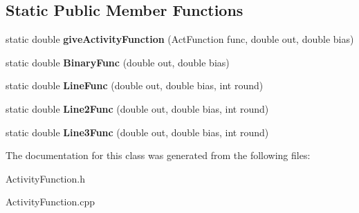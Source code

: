 \subsection*{Static Public Member Functions}
\begin{DoxyCompactItemize}
\item 
\hypertarget{class_activity_function_af2979865b0ed0fdd45f87b794c05bdc7}{}\label{class_activity_function_af2979865b0ed0fdd45f87b794c05bdc7} 
static double {\bfseries give\+Activity\+Function} (Act\+Function func, double out, double bias)
\item 
\hypertarget{class_activity_function_a9750a0424198f685946b3e3b8d3d19b0}{}\label{class_activity_function_a9750a0424198f685946b3e3b8d3d19b0} 
static double {\bfseries Binary\+Func} (double out, double bias)
\item 
\hypertarget{class_activity_function_a3992015d3e75ed3c00590b446271be72}{}\label{class_activity_function_a3992015d3e75ed3c00590b446271be72} 
static double {\bfseries Line\+Func} (double out, double bias, int round)
\item 
\hypertarget{class_activity_function_a13f9b922b9a349b91504fdc5c8606f89}{}\label{class_activity_function_a13f9b922b9a349b91504fdc5c8606f89} 
static double {\bfseries Line2\+Func} (double out, double bias, int round)
\item 
\hypertarget{class_activity_function_a61fdd8afefca23b237685a2f7a303475}{}\label{class_activity_function_a61fdd8afefca23b237685a2f7a303475} 
static double {\bfseries Line3\+Func} (double out, double bias, int round)
\end{DoxyCompactItemize}


The documentation for this class was generated from the following files\+:\begin{DoxyCompactItemize}
\item 
Activity\+Function.\+h\item 
Activity\+Function.\+cpp\end{DoxyCompactItemize}
